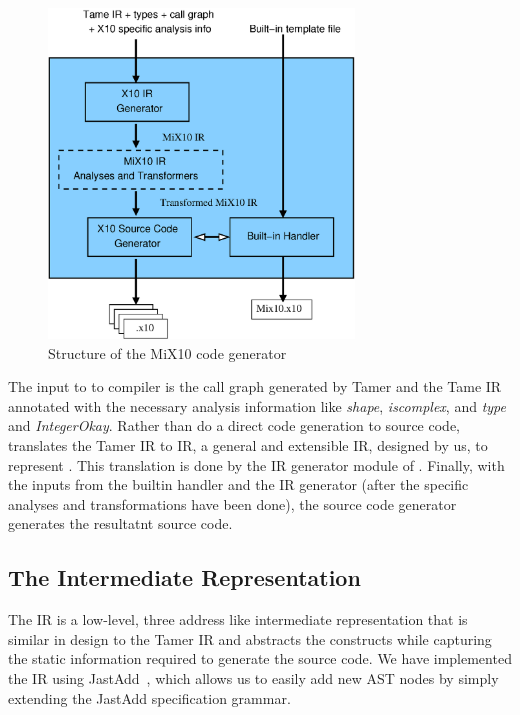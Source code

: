 \begin{figure}[htbp] 
\begin{center}
\includegraphics[width=3.2in]{Figures/x10.eps} 
\caption{Structure of the MiX10 code generator}\label{Fig:x10}
\end{center}
\end{figure}

 The input to to \mixten compiler is the call graph generated by Tamer and the
Tame IR annotated with the necessary analysis information like \emph{shape},
\emph{iscomplex}, and \emph{type} and \emph{IntegerOkay}.  Rather than do a
direct code generation to \xten source code, \mixten translates the Tamer IR to
\mixten IR, a general and extensible IR, designed by us, to represent \xten.
This translation is done by the \xten IR generator module of \mixten. Finally,
with the inputs from the builtin handler and the \xten IR generator (after the
\xten specific analyses and transformations have been done), the \xten source
code generator generates the resultatnt \xten source code.

\subsection{The \mixten Intermediate Representation}

The \mixten IR is a low-level, three address like intermediate representation
that is similar in design to the Tamer IR and abstracts the \xten constructs
while capturing the static information required to generate the \xten source
code.
We have implemented the IR using JastAdd~\cite{ekman04,jastaddurl}, which allows
us to easily add new AST nodes by simply extending the JastAdd
specification grammar.

